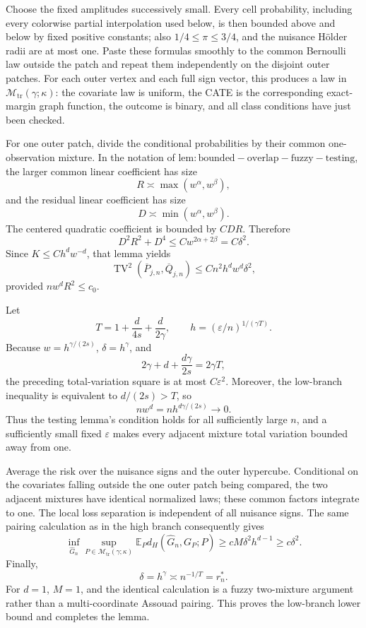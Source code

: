Choose the fixed amplitudes successively small. Every cell probability, including every colorwise partial interpolation used below, is then bounded above and below by fixed positive constants; also \(1/4\le\pi\le3/4\), and the nuisance Hölder radii are at most one. Paste these formulas smoothly to the common Bernoulli law outside the patch and repeat them independently on the disjoint outer patches. For each outer vertex and each full sign vector, this produces a law in \(\mathcal M_{\mathrm{tr}}(\gamma;\kappa)\): the covariate law is uniform, the CATE is the corresponding exact-margin graph function, the outcome is binary, and all class conditions have just been checked.

For one outer patch, divide the conditional probabilities by their common one-observation mixture. In the notation of \(\mathrm{lem:bounded-overlap-fuzzy-testing}\), the larger common linear coefficient has size
\[
 R\asymp\max(w^\alpha,w^\beta),
\]
and the residual linear coefficient has size
\[
 D\asymp\min(w^\alpha,w^\beta).
\]
The centered quadratic coefficient is bounded by \(C DR\). Therefore
\[
 D^2R^2+D^4
 \le Cw^{2\alpha+2\beta}=C\delta^2.
\]
Since \(K\le Ch^dw^{-d}\), that lemma yields
\[
 \operatorname{TV}^2(\overline P_{j,n},\overline Q_{j,n})
 \le Cn^2h^dw^d\delta^2,
\]
provided \(nw^dR^2\le c_0\).

Let
\[
 T=1+\frac d{4s}+\frac d{2\gamma},
 \qquad
 h=(\varepsilon/n)^{1/(\gamma T)}.
\]
Because \(w=h^{\gamma/(2s)}\), \(\delta=h^\gamma\), and
\[
 2\gamma+d+\frac{d\gamma}{2s}=2\gamma T,
\]
the preceding total-variation square is at most \(C\varepsilon^2\). Moreover, the low-branch inequality is equivalent to \(d/(2s)>T\), so
\[
 nw^d=n h^{d\gamma/(2s)}\longrightarrow0.
\]
Thus the testing lemma's condition holds for all sufficiently large \(n\), and a sufficiently small fixed \(\varepsilon\) makes every adjacent mixture total variation bounded away from one.

Average the risk over the nuisance signs and the outer hypercube. Conditional on the covariates falling outside the one outer patch being compared, the two adjacent mixtures have identical normalized laws; these common factors integrate to one. The local loss separation is independent of all nuisance signs. The same pairing calculation as in the high branch consequently gives
\[
 \inf_{\widehat G_n}\sup_{P\in\mathcal M_{\mathrm{tr}}(\gamma;\kappa)}
 \mathbb E_Pd_H(\widehat G_n,G_P;P)
 \ge cM\delta^2h^{d-1}\ge c\delta^2.
\]
Finally,
\[
 \delta=h^\gamma\asymp n^{-1/T}=r_n^*.
\]
For \(d=1\), \(M=1\), and the identical calculation is a fuzzy two-mixture argument rather than a multi-coordinate Assouad pairing. This proves the low-branch lower bound and completes the lemma.
